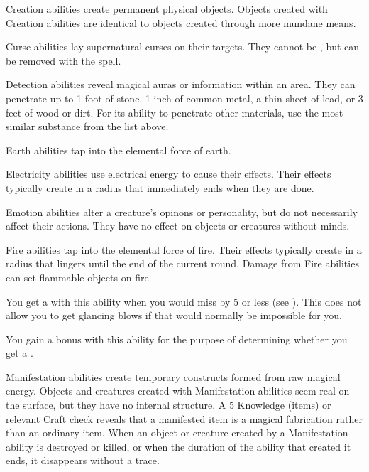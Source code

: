    Creation abilities create permanent physical objects.
  Objects created with Creation abilities are identical to objects created through more mundane means.

   Curse abilities lay supernatural curses on their targets.
  They cannot be , but can be removed with the  spell.

  \label{Detection} Detection abilities reveal magical auras or information within an area.
  They can penetrate up to 1 foot of stone, 1 inch of common metal, a thin sheet of lead, or 3 feet of wood or dirt.
  For its ability to penetrate other materials, use the most similar substance from the list above.

   Earth abilities tap into the elemental force of earth.

   Electricity abilities use electrical energy to cause their effects.
  Their effects typically create  in a \smallarea radius that immediately ends when they are done.

   Emotion abilities alter a creature's opinons or personality, but do not necessarily affect their actions.
  They have no effect on objects or creatures without minds.

   Fire abilities tap into the elemental force of fire.
  Their effects typically create  in a \smallarea radius that lingers until the end of the current round.
  Damage from Fire abilities can set flammable objects on fire.

   You get a  with this ability when you would miss by 5 or less (see ).
  This does not allow you to get glancing blows if that would normally be impossible for you.

   You gain a   bonus with this ability for the purpose of determining whether you get a .

   Manifestation abilities create temporary constructs formed from raw magical energy.
  Objects and creatures created with Manifestation abilities seem real on the surface, but they have no internal structure.
  A  5 Knowledge (items) or relevant Craft check reveals that a manifested item is a magical fabrication rather than an ordinary item.
  When an object or creature created by a Manifestation ability is destroyed or killed, or when the duration of the ability that created it ends, it disappears without a trace.

